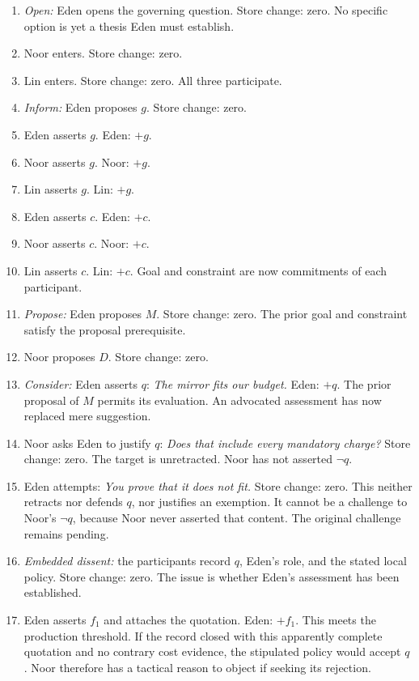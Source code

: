 \begin{enumerate}
\item \emph{Open:} Eden opens the governing question. Store change:
zero. No specific option is yet a thesis Eden must establish.
\item Noor enters. Store change: zero.
\item Lin enters. Store change: zero. All three participate.
\item \emph{Inform:} Eden proposes \(g\). Store change: zero.
\item Eden asserts \(g\). Eden: \(+g\).
\item Noor asserts \(g\). Noor: \(+g\).
\item Lin asserts \(g\). Lin: \(+g\).
\item Eden asserts \(c\). Eden: \(+c\).
\item Noor asserts \(c\). Noor: \(+c\).
\item Lin asserts \(c\). Lin: \(+c\). Goal and constraint are
now commitments of each participant.
\item \emph{Propose:} Eden proposes \(M\). Store change: zero.
The prior goal and constraint satisfy the proposal prerequisite.
\item Noor proposes \(D\). Store change: zero.
\item \emph{Consider:} Eden asserts \(q\): \emph{The mirror fits our
budget.} Eden: \(+q\). The prior proposal of \(M\) permits its evaluation.
An advocated assessment has now replaced mere suggestion.
\item Noor asks Eden to justify \(q\): \emph{Does that include every
mandatory charge?} Store change: zero. The target is unretracted.
Noor has not asserted \(\neg q\).
\item Eden attempts: \emph{You prove that it does not fit.}
Store change: zero. This neither retracts nor defends \(q\), nor
justifies an exemption. It cannot be a challenge to Noor's \(\neg q\),
because Noor never asserted that content. The original challenge
remains pending.
\item \emph{Embedded dissent:} the participants record \(q\), Eden's
role, and the stated local policy. Store change: zero.
The issue is whether Eden's assessment has been established.
\item Eden asserts \(f_1\) and attaches the quotation.
Eden: \(+f_1\). This meets the production threshold.
If the record closed with this apparently complete quotation and
no contrary cost evidence, the stipulated policy would accept \(q\).
Noor therefore has a tactical reason to object if seeking its rejection.

\end{enumerate}
